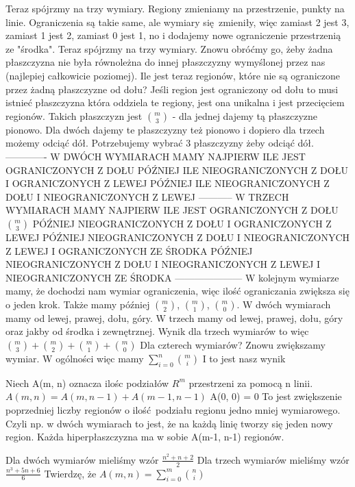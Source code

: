 \documentclass[12pt]{article}
\begin{document}
Teraz spójrzmy na trzy wymiary. Regiony zmieniamy na przestrzenie, punkty na linie. Ograniczenia są takie same, ale wymiary się zmieniły, więc zamiast 2 jest 3, zamiast 1 jest 2, zamiast 0 jest 1, no i dodajemy nowe ograniczenie przestrzenią ze "środka".
Teraz spójrzmy na trzy wymiary. Znowu obróćmy go, żeby żadna płaszczyzna nie była równoleżna do innej płaszczyzny wymyślonej przez nas (najlepiej całkowicie poziomej). Ile jest teraz regionów, które nie są ograniczone przez żadną płaszczyzne od dołu? %
Jeśli region jest ograniczony od dołu to musi istnieć płaszczyzna która oddziela te regiony, jest ona unikalna i jest przecięciem regionów. Takich płaszczyzn jest $\binom{m}{3}$ - dla jednej dajemy tą płaszczyzne pionowo. Dla dwóch dajemy te płaszczyzny też pionowo i dopiero dla trzech możemy odciąć dół. Potrzebujemy wybrać 3 płaszczyzny żeby odciąć dół.
-------------
W DWÓCH WYMIARACH MAMY NAJPIERW ILE JEST OGRANICZONYCH Z DOŁU 
PÓŹNIEJ ILE NIEOGRANICZONYCH Z DOŁU I OGRANICZONYCH Z LEWEJ 
PÓŹNIEJ ILE NIEOGRANICZONYCH Z DOŁU I NIEOGRANICZONYCH Z LEWEJ 
-----------
W TRZECH WYMIARACH MAMY NAJPIERW ILE JEST OGRANICZONYCH Z DOŁU $\binom{m}{3}$
PÓŹNIEJ NIEOGRANICZONYCH Z DOŁU I OGRANICZONYCH Z LEWEJ
PÓŹNIEJ NIEOGRANICZONYCH Z DOŁU I NIEOGRANICZONYCH Z LEWEJ I OGRANICZONYCH ZE ŚRODKA 
PÓŹNIEJ NIEOGRANICZONYCH Z DOŁU I NIEOGRANICZONYCH Z LEWEJ I NIEOGRANICZONYCH ZE ŚRODKA 
---------------------
W kolejnym wymiarze mamy, że dochodzi nam wymiar ograniczenia, więc ilość ograniczania zwiększa się o jeden krok. Także mamy później $\binom{m}{2}$, $\binom{m}{1}$, $\binom{m}{0}$.
W dwóch wymiarach mamy od lewej, prawej, dołu, góry.
W trzech mamy od lewej, prawej, dołu, góry oraz jakby od środka i zewnętrznej.
Wynik dla trzech wymiarów to więc $\binom{m}{3} + \binom{m}{2} + \binom{m}{1} + \binom{m}{0}$
Dla czterech wymiarów? Znowu zwiększamy wymiar.
W ogólności więc mamy 
$\sum_{i=0}^{n} \binom{m}{i}$
I to jest nasz wynik

Niech A(m, n) oznacza ilośc podziałów $R^m$ przestrzeni za pomocą n linii. 
$A(m, n) = A(m, n-1) + A(m-1, n-1)$
A(0, 0) = 0
To jest zwiększenie poprzedniej liczby regionów o ilość podziału regionu jedno mniej wymiarowego.
Czyli np. w dwóch wymiarach to jest, że na każdą linię tworzy się jeden nowy region.
Każda hiperpłaszczyzna ma w sobie A(m-1, n-1) regionów.



Dla dwóch wymiarów mieliśmy wzór $\frac{n^2+n+2}{2}$
Dla trzech wymiarów mieliśmy wzór $\frac{n^3+5n+6}{6}$
Twierdzę, że 
$A(m, n) = \sum_{i=0}^m \binom{n}{i}$
\end{document}
